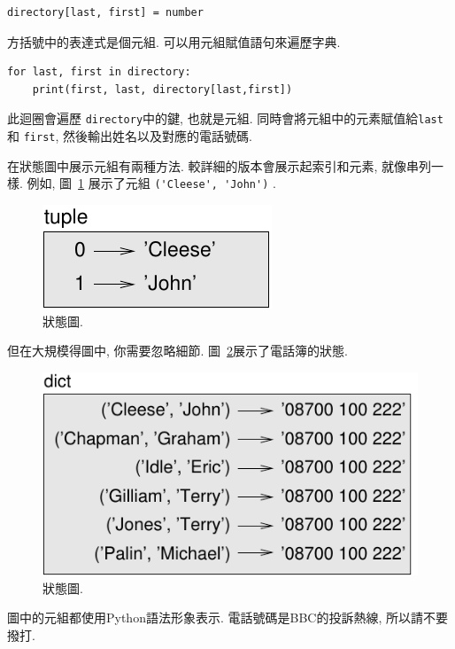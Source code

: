 \documentclass[10pt]{book}
\begin{document}
\begin{verbatim}
directory[last, first] = number
\end{verbatim}
%
方括號中的表達式是個元組. 
可以用元組賦值語句來遍歷字典.

\begin{verbatim}
for last, first in directory:
    print(first, last, directory[last,first])
\end{verbatim}
%
此迴圈會遍歷 {\tt directory}中的鍵, 也就是元組. 
同時會將元組中的元素賦值給{\tt last} 和 {\tt first}, 
然後輸出姓名以及對應的電話號碼. 

在狀態圖中展示元組有兩種方法. 
較詳細的版本會展示起索引和元素, 就像串列一樣. 
例如, 圖~\ref{fig.tuple1} 展示了元組 \verb"('Cleese', 'John')" .

\begin{figure}
\centerline
{\includegraphics[scale=0.8]{figs/tuple1.pdf}}
\caption{狀態圖.}
\label{fig.tuple1}
\end{figure}

但在大規模得圖中, 你需要忽略細節. 
圖~\ref{fig.dict2}展示了電話簿的狀態.

\begin{figure}
\centerline
{\includegraphics[scale=0.8]{figs/dict2.pdf}}
\caption{狀態圖.}
\label{fig.dict2}
\end{figure}

圖中的元組都使用Python語法形象表示. 
電話號碼是BBC的投訴熱線, 所以請不要撥打. 
\end{document}
